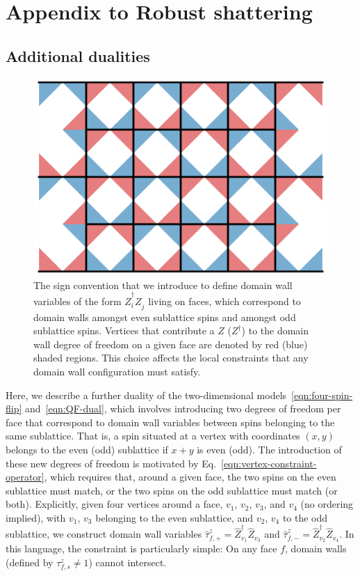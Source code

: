 
\chapter{Appendix to Robust shattering}


\section{Additional dualities}
\label{app:face-DWs}

\begin{figure}
    \centering
    \includegraphics[width=0.3\linewidth]{img/signs2.pdf}
    \caption[The sign convention that we introduce to define domain wall variables]{The sign convention that we introduce to define domain wall variables of the form $\hat{Z}^\dagger_i Z^{\phantom{\dagger}}_j$ living on faces, which correspond to domain walls amongst even sublattice spins and amongst odd sublattice spins. Vertices that contribute a $Z$ ($Z^\dagger$) to the domain wall degree of freedom on a given face are denoted by red (blue) shaded regions. This choice affects the local constraints that any domain wall configuration must satisfy.}
    \label{fig:sign-convention}
\end{figure}

Here, we describe a further duality of the two-dimensional models~\eqref{eqn:four-spin-flip} and~\eqref{eqn:QF-dual}, which involves introducing two degrees of freedom per face that correspond to domain wall variables between spins belonging to the same sublattice.
That is, a spin situated at a vertex with coordinates $(x,y)$ belongs to the even (odd) sublattice if $x+y$ is even (odd).
The introduction of these new degrees of freedom is motivated by Eq.~\eqref{eqn:vertex-constraint-operator}, which requires that, around a given face, the two spins on the even sublattice must match, or the two spins on the odd sublattice must match (or both).
Explicitly, given four vertices around a face, $v_1$, $v_2$, $v_3$, and $v_4$ (no ordering implied), with $v_1$, $v_3$ belonging to the even sublattice, and $v_2$, $v_4$ to the odd sublattice, we construct domain wall variables $\hat{\tau}_{f,+}^{z} = \hat{{Z}}_{v_1}^\dagger \hat{{Z}}_{v_3}^{\phantom{\dagger}}$ and $\hat{\tau}_{f,-}^z = \hat{{Z}}_{v_2}^\dagger \hat{{Z}}_{v_4}^{\phantom{\dagger}}$.
In this language, the constraint is particularly simple: On any face $f$, domain walls (defined by ${\tau}_{f,s}^z \neq 1$) cannot intersect. 

